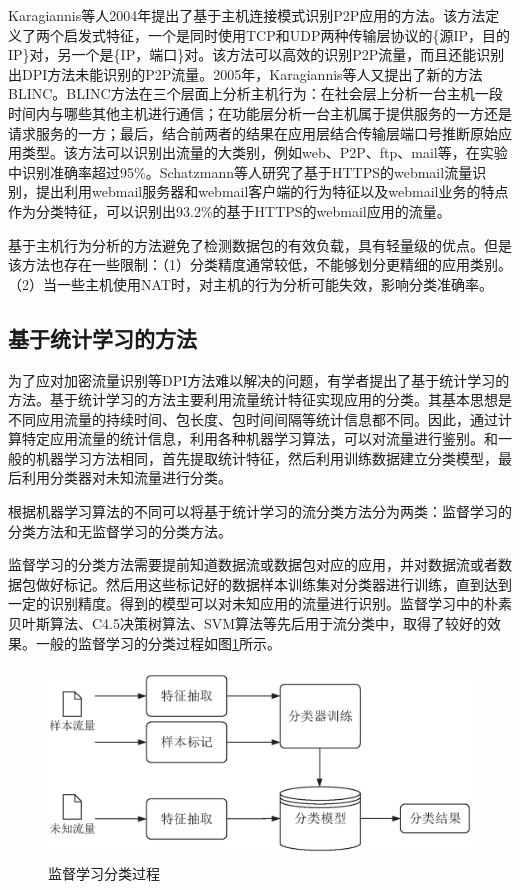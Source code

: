 Karagiannis等人2004年提出了基于主机连接模式识别P2P应用的方法\supercite{karagiannis2004transport}。该方法定义了两个启发式特征，一个是同时使用TCP和UDP两种传输层协议的\{源IP，目的IP\}对，另一个是\{IP，端口\}对。该方法可以高效的识别P2P流量，而且还能识别出DPI方法未能识别的P2P流量。2005年，Karagiannis等人又提出了新的方法BLINC\supercite{karagiannis2005blinc}。BLINC方法在三个层面上分析主机行为：在社会层上分析一台主机一段时间内与哪些其他主机进行通信；在功能层分析一台主机属于提供服务的一方还是请求服务的一方；最后，结合前两者的结果在应用层结合传输层端口号推断原始应用类型。该方法可以识别出流量的大类别，例如web、P2P、ftp、mail等，在实验中识别准确率超过95\%。Schatzmann等人研究了基于HTTPS的webmail流量识别，提出利用webmail服务器和webmail客户端的行为特征以及webmail业务的特点作为分类特征，可以识别出93.2\%的基于HTTPS的webmail应用的流量\supercite{schatzmann2010digging}。

基于主机行为分析的方法避免了检测数据包的有效负载，具有轻量级的优点。但是该方法也存在一些限制：（1）分类精度通常较低，不能够划分更精细的应用类别。（2）当一些主机使用NAT时，对主机的行为分析可能失效，影响分类准确率。

\subsection{基于统计学习的方法}
为了应对加密流量识别等DPI方法难以解决的问题，有学者提出了基于统计学习的方法。基于统计学习的方法主要利用流量统计特征实现应用的分类。其基本思想是不同应用流量的持续时间、包长度、包时间间隔等统计信息都不同。因此，通过计算特定应用流量的统计信息，利用各种机器学习算法，可以对流量进行鉴别。和一般的机器学习方法相同，首先提取统计特征，然后利用训练数据建立分类模型，最后利用分类器对未知流量进行分类。

根据机器学习算法的不同可以将基于统计学习的流分类方法分为两类：监督学习的分类方法和无监督学习的分类方法。

监督学习的分类方法需要提前知道数据流或数据包对应的应用，并对数据流或者数据包做好标记。然后用这些标记好的数据样本训练集对分类器进行训练，直到达到一定的识别精度。得到的模型可以对未知应用的流量进行识别。监督学习中的朴素贝叶斯算法、C4.5决策树算法、SVM算法等先后用于流分类中，取得了较好的效果。一般的监督学习的分类过程如图\ref{fig:22}所示。

\begin{figure}[thb]
\centering
\includegraphics[height=2in]{./figures/2/2-2}
\caption{监督学习分类过程}
\label{fig:22}
\end{figure}

